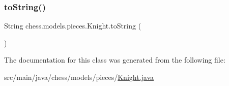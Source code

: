 \subsubsection{\texorpdfstring{to\+String()}{toString()}}
{\footnotesize\ttfamily String chess.\+models.\+pieces.\+Knight.\+to\+String (\begin{DoxyParamCaption}{ }\end{DoxyParamCaption})}



The documentation for this class was generated from the following file\+:\begin{DoxyCompactItemize}
\item 
src/main/java/chess/models/pieces/\mbox{\hyperlink{_knight_8java}{Knight.\+java}}\end{DoxyCompactItemize}
